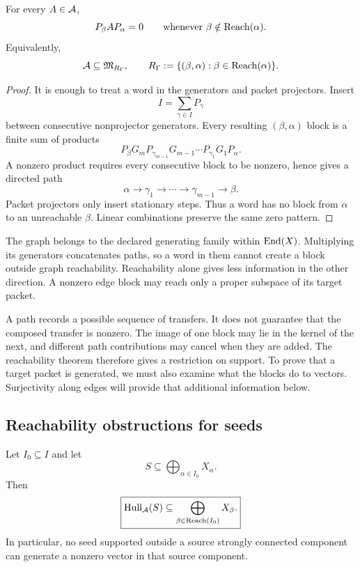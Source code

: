 \begin{theorem}
\label{thm:algebra-reachability-support}
For every $A\in\mathcal A$,
\[
P_\beta AP_\alpha=0
\qquad\text{whenever }\beta\notin\operatorname{Reach}(\alpha).
\]
Equivalently,
\[
\mathcal A\subseteq\mathfrak M_{R_\Gamma},
\qquad
R_\Gamma:=\{(\beta,\alpha):\beta\in\operatorname{Reach}(\alpha)\}.
\]
\end{theorem}

\begin{proof}
It is enough to treat a word in the generators and packet projectors.  Insert
\[
I=\sum_{\gamma\in I}P_\gamma
\]
between consecutive nonprojector generators.  Every resulting $(\beta,\alpha)$ block is a finite sum of products
\[
P_\beta G_mP_{\gamma_{m-1}}
G_{m-1}\cdots
P_{\gamma_1}G_1P_\alpha.
\]
A nonzero product requires every consecutive block to be nonzero, hence gives a directed path
\[
\alpha\to\gamma_1\to\cdots\to\gamma_{m-1}\to\beta.
\]
Packet projectors only insert stationary steps.  Thus a word has no block from $\alpha$ to an unreachable $\beta$.  Linear combinations preserve the same zero pattern.
\end{proof}

\begin{interpretation}
The graph belongs to the declared generating family within \(\operatorname{End}(X)\).  Multiplying its generators concatenates paths, so a word in them cannot create a block outside graph reachability.  Reachability alone gives less information in the other direction.  A nonzero edge block may reach only a proper subspace of its target packet.
\end{interpretation}


A path records a possible sequence of transfers.  It does not guarantee that the composed transfer is nonzero.  The image of one block may lie in the kernel of the next, and different path contributions may cancel when they are added.  The reachability theorem therefore gives a restriction on support.  To prove that a target packet is generated, we must also examine what the blocks do to vectors.  Surjectivity along edges will provide that additional information below.

\subsection{Reachability obstructions for seeds}
\begin{proposition}
\label{prop:reachability-obstruction}
Let $I_0\subseteq I$ and let
\[
S\subseteq\bigoplus_{\alpha\in I_0}X_\alpha.
\]
Then
\[
\boxed{
\operatorname{Hull}_{\mathcal A}(S)
\subseteq
\bigoplus_{\beta\in\operatorname{Reach}(I_0)}X_\beta.
}
\]
In particular, no seed supported outside a source strongly connected component can generate a nonzero vector in that source component.
\end{proposition}


